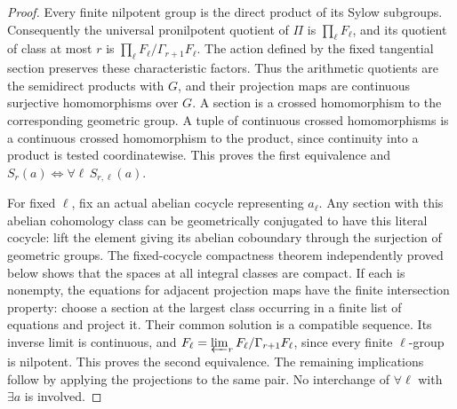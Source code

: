 \begin{proof}
Every finite nilpotent group is the direct product of its Sylow subgroups.
Consequently the universal pronilpotent quotient of \(\Pi\) is
\(\prod_\ell F_\ell\), and its quotient of class at most \(r\) is
\(\prod_\ell F_\ell/\Gamma_{r+1}F_\ell\).
The action defined by the fixed tangential section preserves these
characteristic factors. Thus the arithmetic quotients are the semidirect
products with \(G\), and their projection maps are continuous
surjective homomorphisms over \(G\). A section is a crossed
homomorphism to the corresponding geometric group.
A tuple of continuous crossed homomorphisms is a continuous crossed
homomorphism to the product, since continuity into a product is tested
coordinatewise. This proves the first equivalence and
\(S_r(a)\Longleftrightarrow\forall\ell\,S_{r,\ell}(a)\).

For fixed \(\ell\), fix an actual abelian cocycle representing
\(a_\ell\). Any section with this abelian cohomology class can be
geometrically conjugated to have this literal cocycle: lift the element
giving its abelian coboundary through the surjection of geometric groups.
The fixed-cocycle compactness theorem independently proved below shows
that the spaces at all integral classes are compact. If each is nonempty,
the equations for adjacent projection maps have the finite intersection
property: choose a section at the largest class occurring in a finite
list of equations and project it. Their common solution is a compatible
sequence. Its inverse limit is continuous, and
\(F_\ell=\varprojlim_r F_\ell/\Gamma_{r+1}F_\ell\), since every
finite \(\ell\)-group is nilpotent. This proves the second equivalence.
The remaining implications follow by applying the projections to the
same pair. No interchange of \(\forall\ell\) with \(\exists a\)
is involved.
\end{proof}



